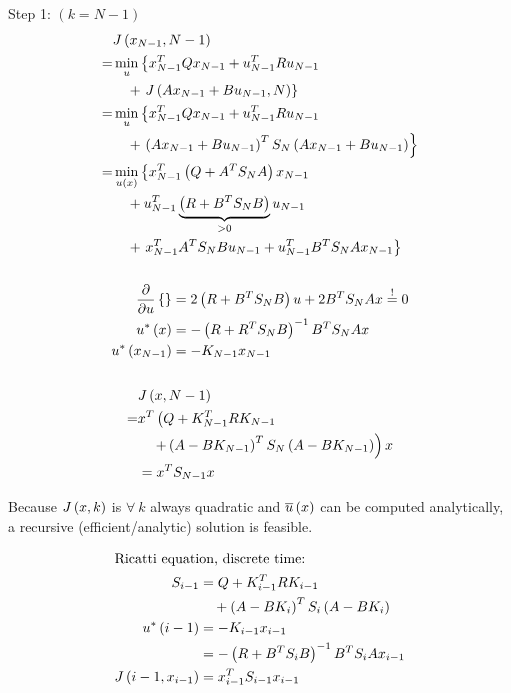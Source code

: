 Step 1: $(k=N-1)$
\begin{gather*}
\begin{align*}
    &J \left( x_{N-1},N-1 \right)\\
    = &\min_u \left\lbrace x_{N-1}^T Q x_{N-1} + u_{N-1}^T R u_{N-1} \right. \\
    &\quad + \left. J \left( Ax_{N-1} + Bu_{N-1}, N \right) \right\rbrace\\
    = &\min_u \left\lbrace x_{N-1}^T Q x_{N-1} + u_{N-1}^T R u_{N-1} \right. \\
    &\quad + \left. \left( Ax_{N-1} + Bu_{N-1} \right)^T S_N \left( Ax_{N-1} + Bu_{N-1} \right) \right\rbrace\\
    = &\min_{u(x)} \left\lbrace x_{N-1}^T \left( Q + A^TS_NA \right) x_{N-1} \right.\\
    &\quad + u_{N-1}^T \underbrace{\left( R + B^TS_NB \right)}_{>0} u_{N-1} \\
    &\quad + \left. x_{N-1}^TA^TS_NBu_{N-1} + u_{N-1}^TB^TS_NAx_{N-1} \right\rbrace\\
\end{align*}\\~\\
\begin{align*}
    \dfrac{\partial}{\partial u}\left\lbrace  \right\rbrace &= 2\left( R+B^TS_NB \right)u + 2B^TS_NAx \overset{!}{=} 0\\
    u^* \left( x \right) &= -\left( R + R^TS_NB \right)^{-1} B^TS_NAx\\
    u^* \left( x_{N-1} \right) &= -K_{N-1}x_{N-1}
\end{align*}\\
~\\
\begin{align*}
    & J \left( x,N-1 \right)\\
    = & x^T \left( Q + K_{N-1}^TRK_{N-1} \right. \\
    &\quad \left. +  \left( A - BK_{N-1} \right) ^T S_N  \left( A - BK_{N-1} \right)  \right) x\\
    & = x^T S_{N-1} x
\end{align*}
\end{gather*}

Because $J \left( x,k \right)$ is $\forall~k$ always quadratic and $\ubar{x}$ can be computed analytically, a recursive (efficient/analytic) solution is feasible.

\begin{align}
\intertext{Ricatti equation, discrete time:}
    S_{i-1} &= Q + K^T_{i-1}RK_{i-1} \nonumber \\
        &\quad + \left( A - BK_i \right)^T S_i \left( A - BK_i \right)\\
    u^* \left( i-1 \right) &= - K_{i-1}x_{i-1} \nonumber\\
        &= -\left( R + B^TS_iB \right)^{-1} B^TS_i Ax_{i-1}\\
    J \left( i-1,x_{i-1} \right) &= x_{i-1}^TS_{i-1} x_{i-1}
\end{align}

